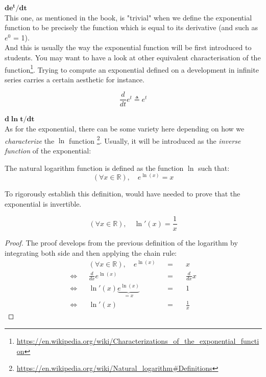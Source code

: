 \documentclass[solutions.tex]{subfiles}
\begin{document}
\hr
$\bm{d e^t/dt}$\,\\
This one, as mentioned in the book, is "trivial" when we define the
exponential function to be precisely the function which is equal to
its derivative (and such as $e^0$ = 1). \\

And this is usually the way the exponential function will be first
introduced to students. You may want to have a look at other equivalent
characterisation of the function\footnote
{\url{https://en.wikipedia.org/wiki/Characterizations\_of\_the\_exponential\_function}}.
Trying to compute an exponential defined on a development in infinite
series carries a certain aesthetic for instance.

\[ \boxed{\frac{d}{dt}e^t \triangleq e^t} \]

\hr
$\bm{d\ln t/dt}$\,\\
As for the exponential, there can be some variety here depending
on how we \textit{characterize} the $\ln$ function
\footnote{\url{https://en.wikipedia.org/wiki/Natural\_logarithm\#Definitions}}.
Usually, it will be introduced as the \textit{inverse function} of
the exponential:
\begin{definition}
The natural logarithm function is defined as the function $\ln$ such that:
\[
	(\forall x\in\mathbb{R}),\quad \boxed{e^{\ln(x)} = x}
\]
\end{definition}
\begin{remark} To rigorously establish this definition, would have
needed to prove that the exponential is invertible.
\end{remark}

\begin{theorem}
\[
	(\forall x\in\mathbb{R}),\quad \boxed{\ln'(x) = \frac1x}
\]
\end{theorem}
\begin{proof}
The proof develops from the previous definition of the logarithm
by integrating both side and then applying the chain rule:
\begin{equation*} \begin{aligned}
	~ && (\forall x\in\mathbb{R}),\quad e^{\ln(x)} &&=\quad& x \\
	\Leftrightarrow && \frac{d}{dx}e^{\ln(x)} &&=\quad& \frac{d}{dx}x \\
	\Leftrightarrow && \ln'(x)\underbrace{e^{\ln(x)}}_{=x} &&=\quad& 1 \\
	\Leftrightarrow && \ln'(x) &&=\quad& \boxed{\frac1x}
\end{aligned} \end{equation*}
\end{proof}
\end{document}
